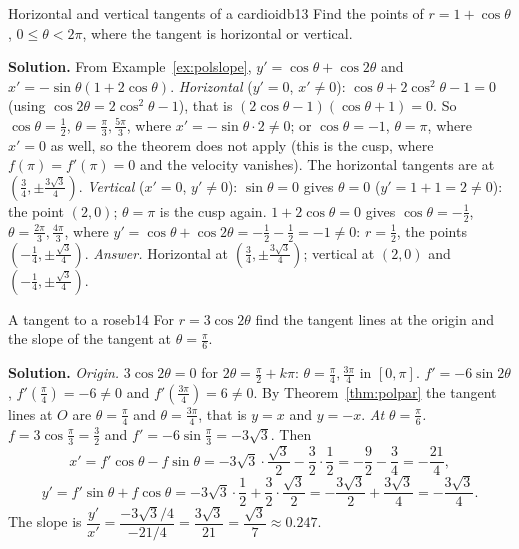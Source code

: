 \documentclass[11pt]{article}
\begin{document}
\begin{exmp}{Horizontal and vertical tangents of a cardioid}{b13}
Find the points of $r=1+\cos\theta$, $0\le\theta<2\pi$, where the tangent is horizontal or vertical.

\textbf{Solution.} From Example~\ref{ex:polslope}, $y'=\cos\theta+\cos2\theta$ and $x'=-\sin\theta(1+2\cos\theta)$. \emph{Horizontal} ($y'=0$, $x'\ne0$): $\cos\theta+2\cos^2\theta-1=0$ (using $\cos2\theta=2\cos^2\theta-1$), that is $(2\cos\theta-1)(\cos\theta+1)=0$. So $\cos\theta=\frac12$, $\theta=\frac\pi3,\frac{5\pi}3$, where $x'=-\sin\theta\cdot2\ne0$; or $\cos\theta=-1$, $\theta=\pi$, where $x'=0$ as well, so the theorem does not apply (this is the cusp, where $f(\pi)=f'(\pi)=0$ and the velocity vanishes). The horizontal tangents are at $\left(\frac34,\pm\frac{3\sqrt3}4\right)$. \emph{Vertical} ($x'=0$, $y'\ne0$): $\sin\theta=0$ gives $\theta=0$ ($y'=1+1=2\ne0$): the point $(2,0)$; $\theta=\pi$ is the cusp again. $1+2\cos\theta=0$ gives $\cos\theta=-\frac12$, $\theta=\frac{2\pi}3,\frac{4\pi}3$, where $y'=\cos\theta+\cos2\theta=-\frac12-\frac12=-1\ne0$: $r=\frac12$, the points $\left(-\frac14,\pm\frac{\sqrt3}4\right)$. \emph{Answer.} Horizontal at $\left(\frac34,\pm\frac{3\sqrt3}4\right)$; vertical at $(2,0)$ and $\left(-\frac14,\pm\frac{\sqrt3}4\right)$.
\end{exmp}

\begin{exmp}{A tangent to a rose}{b14}
For $r=3\cos2\theta$ find the tangent lines at the origin and the slope of the tangent at $\theta=\frac\pi6$.

\textbf{Solution.} \emph{Origin.} $3\cos2\theta=0$ for $2\theta=\frac\pi2+k\pi$: $\theta=\frac\pi4,\frac{3\pi}4$ in $[0,\pi]$. $f'=-6\sin2\theta$, $f'\left(\frac\pi4\right)=-6\ne0$ and $f'\left(\frac{3\pi}4\right)=6\ne0$. By Theorem~\ref{thm:polpar} the tangent lines at $O$ are $\theta=\frac\pi4$ and $\theta=\frac{3\pi}4$, that is $y=x$ and $y=-x$.
\emph{At $\theta=\frac\pi6$.} $f=3\cos\frac\pi3=\frac32$ and $f'=-6\sin\frac\pi3=-3\sqrt3$. Then
\[
x'=f'\cos\theta-f\sin\theta=-3\sqrt3\cdot\frac{\sqrt3}2-\frac32\cdot\frac12=-\frac92-\frac34=-\frac{21}4,
\]
\[
y'=f'\sin\theta+f\cos\theta=-3\sqrt3\cdot\frac12+\frac32\cdot\frac{\sqrt3}2=-\frac{3\sqrt3}2+\frac{3\sqrt3}4=-\frac{3\sqrt3}4.
\]
The slope is $\dfrac{y'}{x'}=\dfrac{-3\sqrt3/4}{-21/4}=\dfrac{3\sqrt3}{21}=\dfrac{\sqrt3}7\approx0.247$.
\end{exmp}
\end{document}
